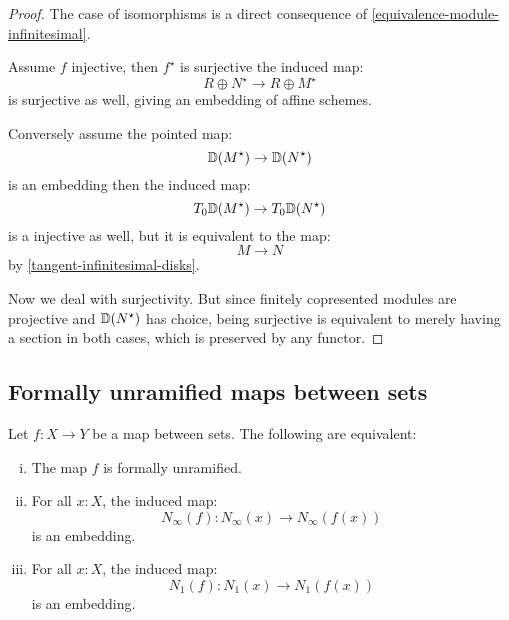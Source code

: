 \begin{proof}
The case of isomorphisms is a direct consequence of \cref{equivalence-module-infinitesimal}.

Assume $f$ injective, then $f^\star$ is surjective the induced map:
\[R\oplus N^\star \to R\oplus M^\star\]
is surjective as well, giving an embedding of affine schemes. 

Conversely assume the pointed map:
\[\mathbb{D}(M^\star) \to \mathbb{D}(N^\star)\]
is an embedding then the induced map:
\[T_0\mathbb{D}(M^\star) \to T_0\mathbb{D}(N^\star)\]
is a injective as well, but it is equivalent to the map:
\[M\to N\]
by \cref{tangent-infinitesimal-disks}.

Now we deal with surjectivity. But since finitely copresented modules are projective and $\mathbb{D}(N^\star)$ has choice, being surjective is equivalent to merely having a section in both cases, which is preserved by any functor.
\end{proof}

\subsection{Formally unramified maps between sets}

\begin{proposition}\label{unramified-sets-map}
Let $f:X\to Y$ be a map between sets. The following are equivalent:
\begin{enumerate}[(i)]
\item The map $f$ is formally unramified.
\item For all $x:X$, the induced map:
\[N_\infty(f) : N_\infty(x)\to N_\infty(f(x))\]
is an embedding.
\item For all $x:X$, the induced map:
\[N_1(f) : N_1(x)\to N_1(f(x))\]
is an embedding.
\end{enumerate}
\end{proposition}

